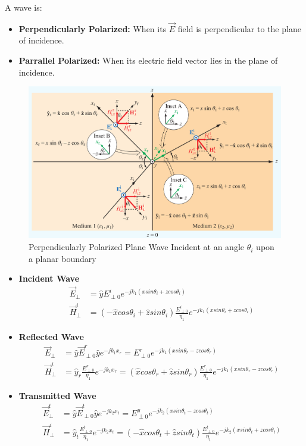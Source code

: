 \documentclass{book}
\begin{document}
A wave is:
\begin{itemize}
	\item \textbf{Perpendicularly Polarized:} When its $\vec{E}$ field is perpendicular to the plane of incidence.
	\item \textbf{Parrallel Polarized:} When its electric field vector lies in the plane of incidence.  
\end{itemize}

\begin{figure}[h]
	\centering
	\includegraphics[width=0.4\linewidth]{Screenshots/incident_planes1}
	\caption{Perpendicularly Polarized Plane Wave Incident at an angle $\theta_i$ upon a planar boundary}
	\label{fig:incidentplanes1}
\end{figure}

\begin{itemize}
	\item \textbf{Incident Wave}
	\begin{align*}
		\vec{E} _\perp &= \hat{y} E^i_{\perp 0} e^{-jk_1(xsin\theta_i +zcos\theta_i)} \\
		\vec{H}_\perp ^i &= (-\hat{x} cos\theta_i + \hat{z} sin\theta_i) \frac{E_{\perp0 }^i}{\eta _1} e^{-jk_1 (xsin\theta_i + z cos\theta_i)}
	\end{align*}
	\item \textbf{Reflected Wave}
	\begin{align*}
		\vec{E} _\perp &= \hat{y} \vec{E}_{\perp0} ^r\hat{y}e^{-jk_1 x_r} = E^r_{\perp 0} e^{-jk_1(xsin\theta_r -zcos\theta_r)} \\
		\vec{H}_\perp ^i &= \hat{y}_r \frac{E^r_{\perp0}}{\eta_1} e^{-jk_1 x_r} = (\hat{x} cos\theta_r + \hat{z} sin \theta_r) \frac{E_{\perp0}^r}{\eta_1} e^{-jk_1(xsin\theta_r - zcos\theta_r)}
	\end{align*}
	\item \textbf{Transmitted Wave}
	\begin{align*}
		\vec{E} _\perp^t &= \hat{y} \vec{E}_{\perp0} ^t\hat{y}e^{-jk_2 x_t} = E^y_{\perp 0} e^{-jk_2(xsin\theta_t -zcos\theta_t)} \\
		\vec{H}_\perp ^i &= \hat{y}_t \frac{E^t_{\perp0}}{\eta_1} e^{-jk_2 x_t} = (-\hat{x} cos\theta_t + \hat{z} sin \theta_t) \frac{E_{\perp0}^t}{\eta_1} e^{-jk_2(xsin\theta_t + zcos\theta_t)}
	\end{align*}
\end{itemize}
\end{document}
